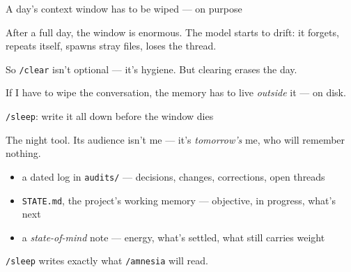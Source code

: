 \documentclass[aspectratio=169,11pt]{beamer}
\begin{document}
  \begin{frame}{A day's context window has to be wiped --- on purpose}
  
  After a full day, the window is enormous. The model starts to drift: it forgets, repeats itself, spawns stray files, loses the thread.
  
  \vspace{0.25cm}
  
  So \texttt{/clear} isn't optional --- it's hygiene. But clearing erases the day.
  
  \vspace{0.35cm}
  
  \alert{If I have to wipe the conversation, the memory has to live \emph{outside} it --- on disk.}
  
  \end{frame}
  

  \begin{frame}{\texttt{/sleep}: write it all down before the window dies}
  
  The night tool. Its audience isn't me --- it's \emph{tomorrow's} me, who will remember nothing.
  
  \vspace{0.25cm}
  
  \begin{itemize}\setlength\itemsep{0.3em}
      \item a dated log in \texttt{audits/} --- decisions, changes, corrections, open threads
      \item \texttt{STATE.md}, the project's working memory --- objective, in progress, what's next
      \item a \emph{state-of-mind} note --- energy, what's settled, what still carries weight
  \end{itemize}

  \vspace{0.3cm}
  
  \alert{\texttt{/sleep} writes exactly what \texttt{/amnesia} will read.}
  
  \end{frame}
\end{document}
